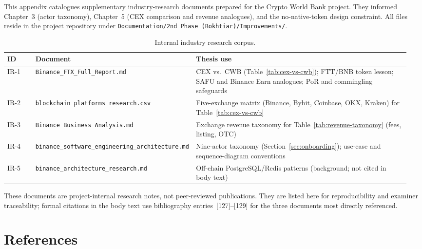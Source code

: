 \documentclass[12pt,a4paper]{report}
\newcommand{\tableheadcolor}{\rowcolor{TableHeadBg}}
\begin{document}
This appendix catalogues supplementary industry-research documents prepared for the Crypto World Bank project. They informed Chapter~3 (actor taxonomy), Chapter~5 (CEX comparison and revenue analogues), and the no-native-token design constraint. All files reside in the project repository under \texttt{Documentation/2nd Phase (Bokhtiar)/Improvements/}.

\begin{table}[H]
\centering
\caption[Internal industry research corpus]{Internal industry research corpus.}
\label{tab:internal-research}
\begingroup
\footnotesize
\setlength{\tabcolsep}{4pt}
\renewcommand{\arraystretch}{1.15}
\begin{tabular}{@{}%
  >{\raggedright\arraybackslash}p{0.07\linewidth}%
  >{\raggedright\arraybackslash}p{0.36\linewidth}%
  >{\raggedright\arraybackslash}p{0.53\linewidth}@{}}
\toprule
\tableheadcolor
\textbf{ID} & \textbf{Document} & \textbf{Thesis use} \\
\midrule
IR-1 & \texttt{Binance\_FTX\_Full\_Report.md} & CEX vs.\ CWB (Table~\ref{tab:cex-vs-cwb}); FTT/BNB token lesson; SAFU and Binance Earn analogues; PoR and commingling safeguards \\
IR-2 & \texttt{blockchain platforms research.csv} & Five-exchange matrix (Binance, Bybit, Coinbase, OKX, Kraken) for Table~\ref{tab:cex-vs-cwb} \\
IR-3 & \texttt{Binance Business Analysis.md} & Exchange revenue taxonomy for Table~\ref{tab:revenue-taxonomy} (fees, listing, OTC) \\
IR-4 & \texttt{binance\_software\_engineering\_architecture.md} & Nine-actor taxonomy (Section~\ref{sec:onboarding}); use-case and sequence-diagram conventions \\
IR-5 & \texttt{binance\_architecture\_research.md} & Off-chain PostgreSQL/Redis patterns (background; not cited in body text) \\
\bottomrule
\end{tabular}
\endgroup
\end{table}

\noindent These documents are project-internal research notes, not peer-reviewed publications. They are listed here for reproducibility and examiner traceability; formal citations in the body text use bibliography entries~[127]--[129] for the three documents most directly referenced.

\chapter*{References}
{}
\end{document}
